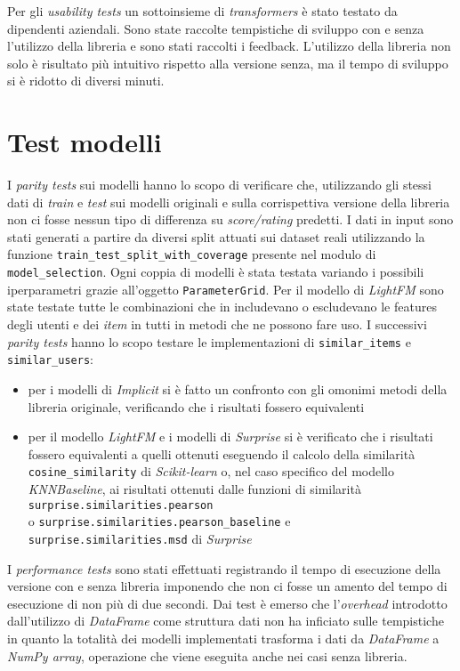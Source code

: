 Per gli \textit{usability tests} un sottoinsieme di \textit{transformers} è stato testato da dipendenti aziendali. Sono state raccolte tempistiche di sviluppo con e senza l'utilizzo della libreria e sono stati raccolti i feedback. L'utilizzo della libreria non solo è risultato più intuitivo rispetto alla versione senza, ma il tempo di sviluppo si è ridotto di diversi minuti. 

\section{Test modelli}
I \textit{parity tests} sui modelli hanno lo scopo di verificare che, utilizzando gli stessi dati di \textit{train} e \textit{test} sui modelli originali e sulla corrispettiva versione della libreria non ci fosse nessun tipo di differenza su \textit{score/rating} predetti. I dati in input sono stati generati a partire da diversi split attuati sui dataset reali utilizzando la funzione \texttt{train\_test\_split\_with\_coverage} presente nel modulo di \texttt{model\_selection}. Ogni coppia di modelli è stata testata variando i possibili iperparametri grazie all'oggetto \texttt{ParameterGrid}. Per il modello di \textit{LightFM} sono state testate tutte le combinazioni che in includevano o escludevano le features degli utenti e dei \textit{item} in tutti in metodi che ne possono fare uso. I successivi \textit{parity tests} hanno lo scopo testare le implementazioni di \texttt{similar\_items} e \texttt{similar\_users}:

\begin{itemize}
    \item per i modelli di \textit{Implicit} si è fatto un confronto con gli omonimi metodi della libreria originale, verificando che i risultati fossero equivalenti
    \item per il modello \textit{LightFM} e i modelli di \textit{Surprise} si è verificato che i risultati fossero equivalenti a quelli ottenuti eseguendo il calcolo della similarità \texttt{cosine\_similarity} di \textit{Scikit-learn} o, nel caso specifico del modello \textit{KNNBaseline}, ai risultati ottenuti dalle funzioni di similarità \\ \texttt{surprise.similarities.pearson} \\ o  \texttt{surprise.similarities.pearson\_baseline} e \\ \texttt{surprise.similarities.msd} di \textit{Surprise}
\end{itemize}

I \textit{performance tests} sono stati effettuati registrando il tempo di esecuzione della versione con e senza libreria imponendo che non ci fosse un amento del tempo di esecuzione di non più di due secondi. Dai test è emerso che l'\textit{overhead} introdotto dall'utilizzo di \textit{DataFrame} come struttura dati non ha inficiato sulle tempistiche in quanto la totalità dei modelli implementati trasforma i dati da \textit{DataFrame} a \textit{NumPy array}, operazione che viene eseguita anche nei casi senza libreria.

